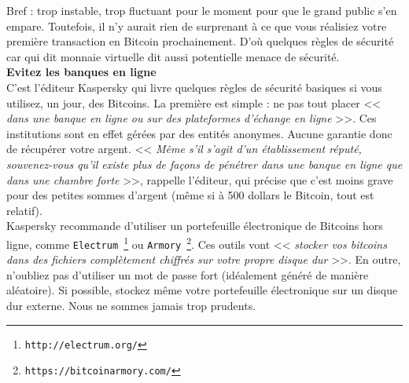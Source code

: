 \documentclass[11pt,twoside,a4paper]{article}
\begin{document}
Bref : trop instable, trop fluctuant pour le moment pour que le grand public s'en empare. Toutefois, il n'y aurait rien de surprenant {\`a} ce que vous r{\'e}alisiez votre premi{\`e}re transaction en Bitcoin prochainement. D'o{\`u} quelques r{\`e}gles de s{\'e}curit{\'e} car qui dit monnaie virtuelle dit aussi potentielle menace de s{\'e}curit{\'e}.  ~\\

\textbf{Evitez les banques en ligne} ~\\

C'est l'{\'e}diteur Kaspersky qui livre quelques r{\`e}gles de s{\'e}curit{\'e} basiques si vous utilisez, un jour, des Bitcoins. La premi{\`e}re est simple : ne pas tout placer << \emph{dans une banque en ligne ou sur des plateformes d'{\'e}change en ligne} >>. Ces institutions sont en effet g{\'e}r{\'e}es par des entit{\'e}s anonymes. Aucune garantie donc de r{\'e}cup{\'e}rer votre argent. << \emph{M{\^e}me s'il s'agit d'un {\'e}tablissement r{\'e}put{\'e}, souvenez-vous qu'il existe plus de fa\c{c}ons de p{\'e}n{\'e}trer dans une banque en ligne que dans une chambre forte} >>, rappelle l'{\'e}diteur, qui pr{\'e}cise que c'est moins grave pour des petites sommes d'argent (m{\^e}me si {\`a} 500 dollars le Bitcoin, tout est relatif). ~\\ 

Kaspersky recommande d'utiliser un portefeuille {\'e}lectronique de Bitcoins hors ligne, comme \texttt{Electrum~\footnote{\texttt{http://electrum.org/}}} ou \texttt{Armory~\footnote{\texttt{https://bitcoinarmory.com/}}}. Ces outils vont << \emph{stocker vos bitcoins dans des fichiers compl{\`e}tement chiffr{\'e}s sur votre propre disque dur} >>. En outre, n'oubliez pas d'utiliser un mot de passe fort (id{\'e}alement g{\'e}n{\'e}r{\'e} de mani{\`e}re al{\'e}atoire). Si possible, stockez m{\^e}me votre portefeuille {\'e}lectronique sur un disque dur externe. Nous ne sommes jamais trop prudents.  ~\\

\clearpage
\end{document}
